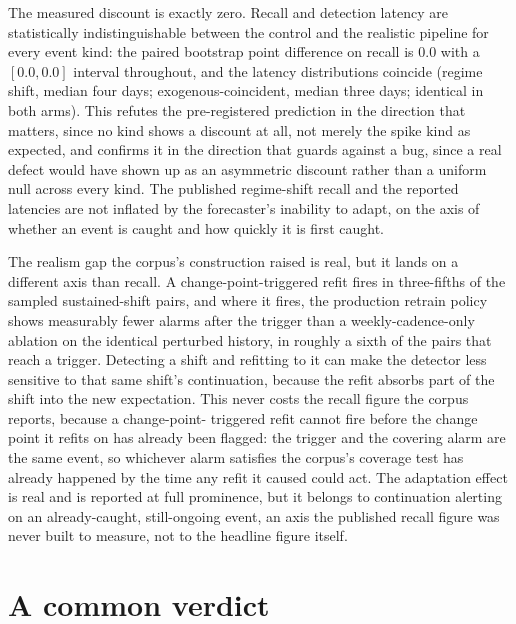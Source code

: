 The measured discount is exactly zero. Recall and detection latency are statistically
indistinguishable between the control and the realistic pipeline for every event kind: the paired
bootstrap point difference on recall is $0.0$ with a $[0.0, 0.0]$ interval throughout, and the
latency distributions coincide (regime shift, median four days; exogenous-coincident, median three
days; identical in both arms). This refutes the pre-registered prediction in the direction that
matters, since no kind shows a discount at all, not merely the spike kind as expected, and confirms
it in the direction that guards against a bug, since a real defect would have shown up as an
asymmetric discount rather than a uniform null across every kind. The published regime-shift
recall and the reported latencies are not inflated by the forecaster's inability to adapt, on the
axis of whether an event is caught and how quickly it is first caught.

The realism gap the corpus's construction raised is real, but it lands on a different axis than
recall. A change-point-triggered refit fires in three-fifths of the sampled sustained-shift pairs,
and where it fires, the production retrain policy shows measurably fewer alarms after the trigger
than a weekly-cadence-only ablation on the identical perturbed history, in roughly a sixth of the
pairs that reach a trigger. Detecting a shift and refitting to it can make the detector less
sensitive to that same shift's continuation, because the refit absorbs part of the shift into the
new expectation. This never costs the recall figure the corpus reports, because a change-point-
triggered refit cannot fire before the change point it refits on has already been flagged: the
trigger and the covering alarm are the same event, so whichever alarm satisfies the corpus's
coverage test has already happened by the time any refit it caused could act. The adaptation effect
is real and is reported at full prominence, but it belongs to continuation alerting on an
already-caught, still-ongoing event, an axis the published recall figure was never built to
measure, not to the headline figure itself.

\section{A common verdict}
\label{sec:results-common}

